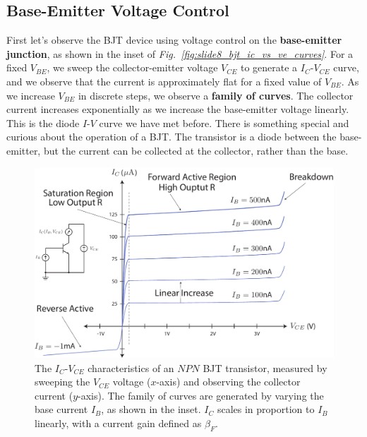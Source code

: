 \subsection{Base-Emitter Voltage Control}
First let's observe the BJT device using voltage control on the \textbf{base-emitter junction}, as shown in the inset of \emph{Fig.~\ref{fig:slide8_bjt_ic_vs_ve_curves}}.  For a fixed $V_{BE}$, we sweep the collector-emitter voltage $V_{CE}$ to generate a $I_C$-$V_{CE}$ curve, and we observe that the current is approximately flat for a fixed value of $V_{BE}$.  As we increase $V_{BE}$ in discrete steps, we observe a \textbf{family of curves}.  The collector current increases exponentially as we increase the base-emitter voltage linearly.  This is the diode $I$-$V$ curve we have met before.  There is something special and curious about the operation of a BJT.  The transistor is a diode between the base-emitter, but the current can be collected at the collector, rather than the base.
\newpage
\begin{figure}[t]
\centering
\includegraphics[width=\columnwidth]{slide7_bjt_ic_vs_ib_curves}
\caption{The $I_C$-$V_{CE}$ characteristics of an $NPN$ BJT transistor, measured by sweeping the $V_{CE}$ voltage ($x$-axis) and observing the collector current ($y$-axis).  The family of curves are generated by varying the base current $I_B$, as shown in the inset.  $I_C$ scales in proportion to $I_B$ linearly, with a current gain defined as $\beta_F$.}
\label{fig:slide7_bjt_ic_vs_ib_curves}
\end{figure}
